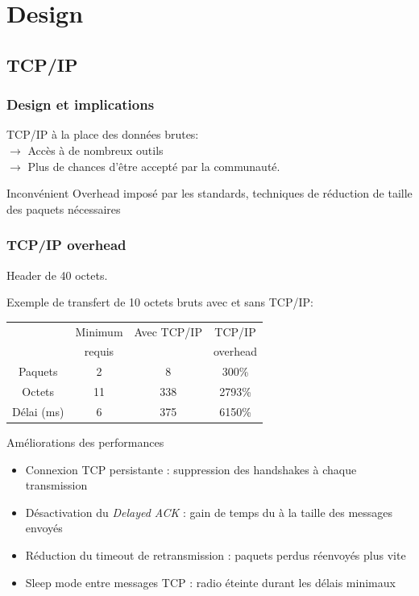 \section{Design}
\subsection{TCP/IP}
\begin{frame}
 \frametitle{Design et implications}
 TCP/IP à la place des données brutes:\\
 \vspace{5mm}
 \textbf{$\rightarrow$} Accès à de nombreux outils\\
 \textbf{$\rightarrow$} Plus de chances d'être accepté par la communauté.\\
 \vspace{5mm}
\begin{block}{Inconvénient}
Overhead imposé par les standards, techniques de réduction de taille des paquets nécessaires
\end{block}
 
\end{frame}
\begin{frame}
\frametitle{TCP/IP overhead}
\begin{center}
 \alert{Header de 40 octets.}
\end{center}
\vspace{5mm}
Exemple de transfert de 10 octets bruts avec et sans TCP/IP: \\
\begin{center}
\begin{tabular}{|c|c|c|c|}
\hline
~ & Minimum & Avec TCP/IP & TCP/IP\\
~ & requis & ~ & overhead\\
\hline
Paquets & 2 & 8 & 300\% \\
Octets & 11 & 338 & 2793\% \\
Délai (ms) & 6 & 375 & 6150\% \\
\hline
\end{tabular}
\end{center}
\end{frame}

\begin{frame}{Améliorations des performances}
\begin{itemize}
\item Connexion TCP persistante : suppression des handshakes à chaque transmission
\item Désactivation du \textit{Delayed ACK} : gain de temps du à la taille des messages envoyés
\item Réduction du timeout de retransmission : paquets perdus réenvoyés plus vite
\item Sleep mode entre messages TCP : radio éteinte durant les délais minimaux
\end{itemize}
\end{frame}

